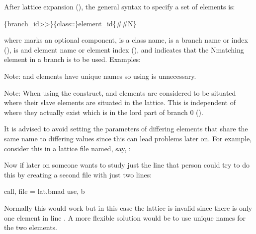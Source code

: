 {{{{{After lattice expansion (), the general syntax to specify a set of elements is:
\begin{example}
  \{branch_id>>\}\{class::\}element_id\{##N\}
\end{example}
where  marks an optional component,  is a class name,  is a
branch name or index (),  is and element name or element index
(), and  indicates that the N\Th matching element in a branch is to be
used. Examples:
Note:  and  elements have unique names so using \vn{\#\#} is unnecessary.

Note: When using the \vn{\#\#} construct,  and  elements are considered 
to be situated where their slave elements are situated in the lattice. This is independent of where
they actually exist which is in the lord part of branch 0 ().

It is advised to avoid setting the parameters of differing elements that share the same
name to differing values since this can lead problems later on. For example, consider this in a
lattice file named, say, :
Now if later on someone wants to study just the  line that person could try to do this by
creating a second file with just two lines:
\begin{example}
  call, file = lat.bmad
  use, b
\end{example}
Normally this would work but in this case the lattice is invalid since there is only one 
element in line . A more flexible solution would be to use unique names for the two 
elements.

}}}}}
